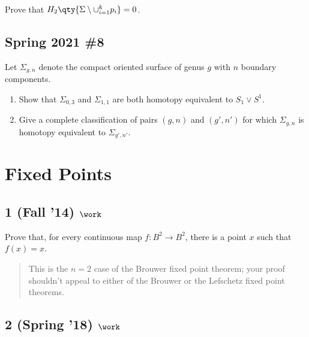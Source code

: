 Prove that \(H_2 \qty{\Sigma \setminus \cup_{i=1}^k {p_i} } = 0\).

\hypertarget{spring-2021-8}{%
\subsection{Spring 2021 \#8}\label{spring-2021-8}}

\begin{problem}[Spring 2021, 8]

Let \(\Sigma_{g, n}\) denote the compact oriented surface of genus \(g\)
with \(n\) boundary components.

\begin{enumerate}
\def\labelenumi{\alph{enumi}.}
\item
  Show that \(\Sigma_{0, 3}\) and \(\Sigma_{1, 1}\) are both homotopy
  equivalent to \(S_1 \vee S^1\).
\item
  Give a complete classification of pairs \((g, n)\) and \((g', n')\)
  for which \(\Sigma_{g, n}\) is homotopy equivalent to
  \(\Sigma_{g', n'}\).
\end{enumerate}

\end{problem}

\hypertarget{fixed-points}{%
\section{Fixed Points}\label{fixed-points}}

\hypertarget{fall-14-work-5}{%
\subsection{\texorpdfstring{1 (Fall '14)
\(\work\)}{1 (Fall '14) \textbackslash work}}\label{fall-14-work-5}}

Prove that, for every continuous map \(f : B^2 \to B^2\), there is a
point \(x\) such that \(f (x) = x\).

\begin{quote}
This is the \(n = 2\) case of the Brouwer fixed point theorem; your
proof shouldn't appeal to either of the Brouwer or the Lefschetz fixed
point theorems.
\end{quote}

\hypertarget{spring-18-work-3}{%
\subsection{\texorpdfstring{2 (Spring '18)
\(\work\)}{2 (Spring '18) \textbackslash work}}\label{spring-18-work-3}}

